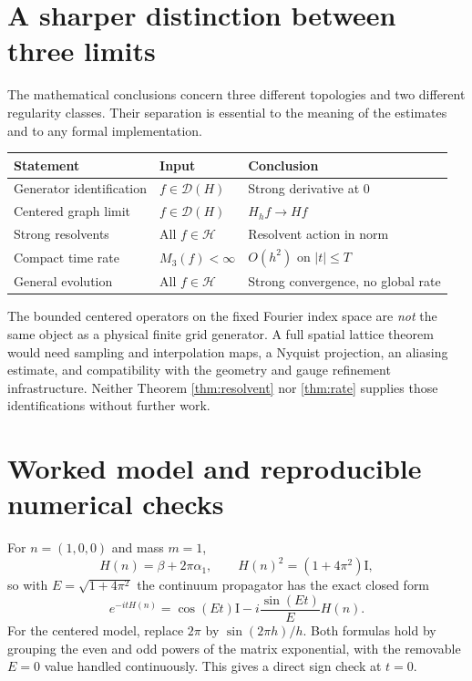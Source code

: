 \documentclass[11pt,oneside]{article}
\theoremstyle{kol}
\theoremstyle{definition}
\newcommand{\Hu}{\mathcal H}
\newcommand{\Dn}{\mathcal D}
\newcommand{\Id}{\mathrm I}
\begin{document}
\section{A sharper distinction between three limits}
The mathematical conclusions concern three different topologies and two different regularity classes. Their separation is essential to the meaning of the estimates and to any formal implementation.

\begin{center}
\small
\begin{tabularx}{\linewidth}{>{\raggedright\arraybackslash}p{1.04in}>{\raggedright\arraybackslash}X>{\raggedright\arraybackslash}p{1.22in}}
\toprule
\textbf{Statement} & \textbf{Input} & \textbf{Conclusion}\\
\midrule
Generator identification & $f\in\Dn(H)$ & Strong derivative at $0$\\
Centered graph limit & $f\in\Dn(H)$ & $H_hf\to Hf$\\
Strong resolvents & All $f\in\Hu$ & Resolvent action in norm\\
Compact time rate & $M_3(f)<\infty$ & $O(h^2)$ on $|t|\le T$\\
General evolution & All $f\in\Hu$ & Strong convergence, no global rate\\
\bottomrule
\end{tabularx}
\end{center}

The bounded centered operators on the fixed Fourier index space are \emph{not} the same object as a physical finite grid generator. A full spatial lattice theorem would need sampling and interpolation maps, a Nyquist projection, an aliasing estimate, and compatibility with the geometry and gauge refinement infrastructure. Neither Theorem \ref{thm:resolvent} nor \ref{thm:rate} supplies those identifications without further work.

\section{Worked model and reproducible numerical checks}
For $n=(1,0,0)$ and mass $m=1$,
\[
H(n)=\beta+2\pi\alpha_1,\qquad H(n)^2=(1+4\pi^2)\Id,
\]
so with $E=\sqrt{1+4\pi^2}$ the continuum propagator has the exact closed form
\[
e^{-itH(n)}=\cos(Et)\Id-i\frac{\sin(Et)}{E}H(n).
\]
For the centered model, replace $2\pi$ by $\sin(2\pi h)/h$. Both formulas hold by grouping the even and odd powers of the matrix exponential, with the removable $E=0$ value handled continuously. This gives a direct sign check at $t=0$.
\end{document}
